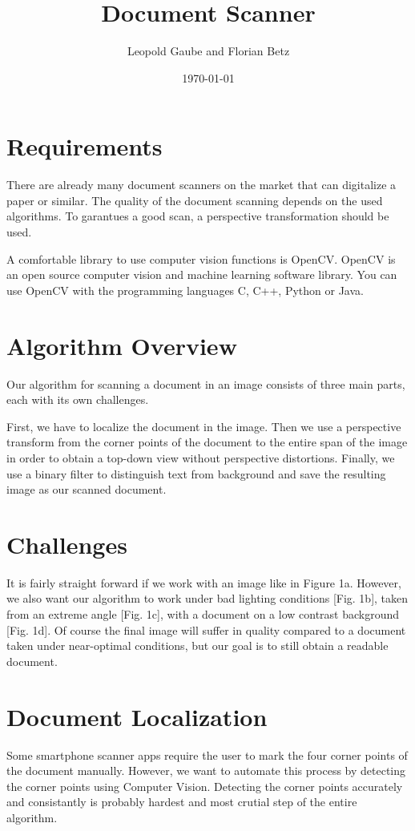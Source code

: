 \documentclass[bibliography=totoc]{scrartcl}
\title{Document Scanner}
\author{Leopold Gaube and Florian Betz}
\date{\today}
\begin{document}
	\maketitle
	\tableofcontents

	\clearpage

	\section{Requirements}

		There are already many document scanners on the market that can digitalize a paper or similar. 
		The quality of the document scanning depends on the used algorithms.
		To garantues a good scan, a perspective transformation should be used.
		
	    A comfortable library to use computer vision functions is \ac{OpenCV}.
	    \ac{OpenCV} is an open source computer vision and machine learning software library. \cite{OpenCV}
	    You can use OpenCV with the programming languages C, C++, Python or Java.
	    
	    

    \section{Algorithm Overview}
	Our algorithm for scanning a document in an image consists of three main parts, each with its own challenges.
	
	First, we have to localize the document in the image. 
	Then we use a perspective transform from the corner points of the document to the entire span of the image in order to obtain a top-down view without perspective distortions.
	Finally, we use a binary filter to distinguish text from background and save the resulting image as our scanned document.

	\section{Challenges}
	It is fairly straight forward if we work with an image like in Figure 1a.
	However, we also want our algorithm to work under bad lighting conditions [Fig. 1b], taken from an extreme angle [Fig. 1c], with a document on a low contrast background [Fig. 1d].
	Of course the final image will suffer in quality compared to a document taken under near-optimal conditions, but our goal is to still obtain a readable document.
	
	\section{Document Localization}
	Some smartphone scanner apps require the user to mark the four corner points of the document manually. 
	However, we want to automate this process by detecting the corner points using Computer Vision.
	Detecting the corner points accurately and consistantly is probably hardest and most crutial step of the entire algorithm. 
	
\end{document}
